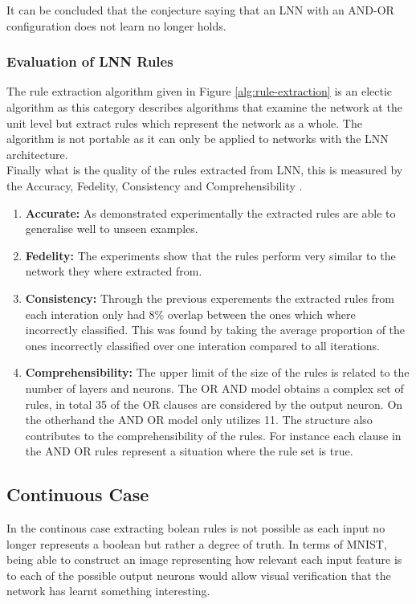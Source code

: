 It can be concluded that the conjecture saying that an LNN with an AND-OR configuration does not learn no longer holds.\\



\subsubsection{Evaluation of LNN Rules}
The rule extraction algorithm given in Figure \ref{alg:rule-extraction} is an electic algorithm as this category describes algorithms that examine the network at the unit level but extract rules which represent the network as a whole. The algorithm is not portable as it can only be applied to networks with the LNN architecture.\\

Finally what is the quality of the rules extracted from LNN, this is measured by the Accuracy, Fedelity, Consistency and Comprehensibility \cite{andrews1995survey}.

\begin{enumerate}
	\item \textbf{Accurate:} As demonstrated experimentally the extracted rules are able to generalise well to unseen examples.
	\item \textbf{Fedelity:} The experiments show that the rules perform very similar to the network they where extracted from.
	\item \textbf{Consistency:} Through the previous experements the extracted rules from each interation only had 8\% overlap between the ones which where incorrectly classified. This was found by taking the average proportion of the ones incorrectly classified over one interation compared to all iterations.
	\item \textbf{Comprehensibility:} The upper limit of the size of the rules is related to the number of layers and neurons. The OR AND model obtains a complex set of rules, in total 35 of the OR clauses are considered by the output neuron. On the otherhand the AND OR model only utilizes 11. The structure also contributes to the comprehensibility of the rules. For instance each clause in the AND OR rules represent a situation where the rule set is true.
\end{enumerate}

\subsection{Continuous Case}
In the continous case extracting bolean rules is not possible as each input no longer represents a boolean but rather a degree of truth. In terms of MNIST, being able to construct an image representing how relevant each input feature is to each of the possible output neurons would allow visual verification that the network has learnt something interesting.\\


